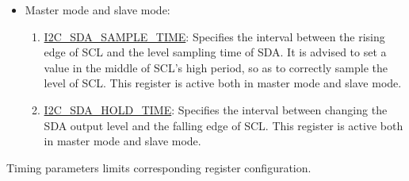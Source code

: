 \documentclass[main\_\_EN.tex]{subfiles}
\begin{document}
\begin{itemize}
\begin{enumerate}
    \centerline{$f_{scl}=\frac{f_{\textrm{I2C\_SCLK}}}
    {\textrm{\hyperref[fielddesc:I2CSCLLOWPERIOD]{I2C\_SCL\_LOW\_PERIOD} + \hyperref[fielddesc:I2CSCLHIGHPERIOD]{I2C\_SCL\_HIGH\_PERIOD} + \hyperref[fielddesc:I2CSCLWAITHIGHPERIOD]{I2C\_SCL\_WAIT\_HIGH\_PERIOD} + 3 + \hyperref[fielddesc:I2CSCLFILTERTHRES]{I2C\_SCL\_FILTER\_THRES} }}$}

where 3 represents the amount of clock cycles required to synchronize the SCL. If the SCL filtering function is turned on, the delay caused by \hyperref[fielddesc:I2CSCLFILTERTHRES]{I2C\_SCL\_FILTER\_THRES} needs to be added. As the SCL low-to-high transition time represented by \hyperref[fielddesc:I2CSCLWAITHIGHPERIOD]{I2C\_SCL\_WAIT\_HIGH\_PERIOD} + 1 module clock can be affected by the pull-up resistor, IO drive capability, SCL line capacitance, etc., deviation may occur between the actual frequency of the test and the theoretical frequency. At this point, deviations can be reduced by adjusting the value of \hyperref[fielddesc:I2CSCLWAITHIGHPERIOD]{I2C\_SCL\_WAIT\_HIGH\_PERIOD}.
\end{enumerate}

\item Master mode and slave mode:

\begin{enumerate}

\item \hyperref[fielddesc:I2CSDASAMPLETIME]{I2C\_SDA\_SAMPLE\_TIME}:
Specifies the interval between the rising edge of SCL and the level sampling time of SDA. It is advised to set a value in the middle of SCL's high period, so as to correctly sample the level of SCL. This register is active both in master mode and slave mode.

\item \hyperref[fielddesc:I2CSDAHOLDTIME]{I2C\_SDA\_HOLD\_TIME}:
Specifies the interval between changing the SDA output level and the falling edge of SCL. This register is active both in master mode and slave mode.

\end{enumerate}
\end{itemize}

Timing parameters limits corresponding register configuration.
\end{document}

